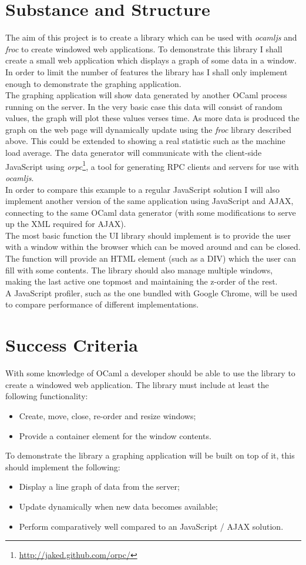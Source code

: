 \documentclass[10pt,a4paper]{article}
\begin{document}
  \section{Substance and Structure}
  The aim of this project is to create a library which can be used with \emph{ocamljs} and \emph{froc} to create windowed web applications. To demonstrate this library I shall create a small web application which displays a graph of some data in a window. In order to limit the number of features the library has I shall only implement enough to demonstrate the graphing application.
  \\
  The graphing application will show data generated by another OCaml process running on the server. In the very basic case this data will consist of random values, the graph will plot these values verses time. As more data is produced the graph on the web page will dynamically update using the \emph{froc} library described above. This could be extended to showing a real statistic such as the machine load average. The data generator will communicate with the client-side JavaScript using \emph{orpc}\footnote{\url{http://jaked.github.com/orpc/}}, a tool for generating RPC clients and servers for use with \emph{ocamljs}.
  \\
  In order to compare this example to a regular JavaScript solution I will also implement another version of the same application using JavaScript and AJAX, connecting to the same OCaml data generator (with some modifications to serve up the XML required for AJAX).
  \\
  The most basic function the UI library should implement is to provide the user with a window within the browser which can be moved around and can be closed. The function will provide an HTML element (such as a DIV) which the user can fill with some contents. The library should also manage multiple windows, making the last active one topmost and maintaining the z-order of the rest.
  \\
  A JavaScript profiler, such as the one bundled with Google Chrome, will be used to compare performance of different implementations.
  \section{Success Criteria}
  With some knowledge of OCaml a developer should be able to use the library to create a windowed web application. The library must include at least the following functionality:
  \begin{itemize}
  \item Create, move, close, re-order and resize windows;
  \item Provide a container element for the window contents.
  \end{itemize}
  To demonstrate the library a graphing application will be built on top of it, this should implement the following:
  \begin{itemize}
  \item Display a line graph of data from the server;
  \item Update dynamically when new data becomes available;
  \item Perform comparatively well compared to an JavaScript / AJAX solution.
  \end{itemize}
\end{document}
